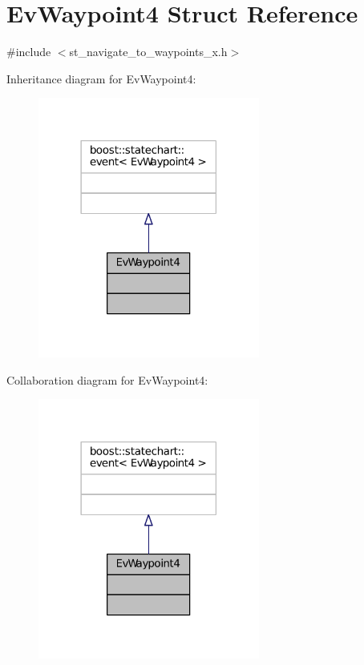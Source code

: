 \hypertarget{structEvWaypoint4}{}\section{Ev\+Waypoint4 Struct Reference}
\label{structEvWaypoint4}


{\ttfamily \#include $<$st\+\_\+navigate\+\_\+to\+\_\+waypoints\+\_\+x.\+h$>$}



Inheritance diagram for Ev\+Waypoint4\+:
\nopagebreak
\begin{figure}[H]
\begin{center}
\leavevmode
\includegraphics[width=206pt]{structEvWaypoint4__inherit__graph}
\end{center}
\end{figure}


Collaboration diagram for Ev\+Waypoint4\+:
\nopagebreak
\begin{figure}[H]
\begin{center}
\leavevmode
\includegraphics[width=206pt]{structEvWaypoint4__coll__graph}
\end{center}
\end{figure}


